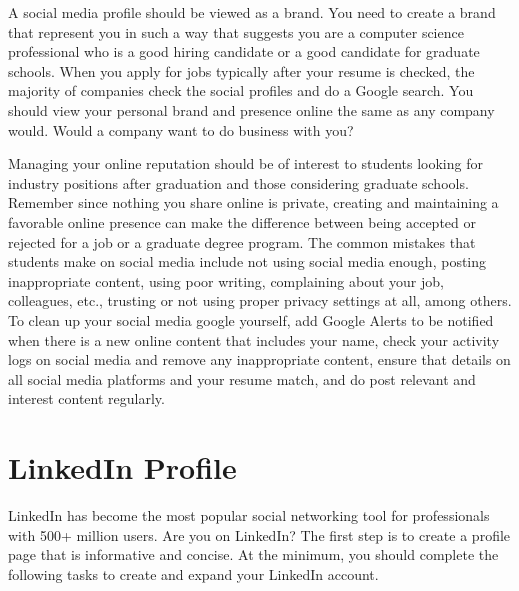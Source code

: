 \documentclass[11pt]{article}
\begin{document}
A social media profile should be viewed as a brand. You need to create a brand that represent you in such a way that suggests you are a computer science professional who is a good hiring candidate or a good candidate for graduate schools. When you apply for jobs typically after your resume is checked, the majority of companies check the social profiles and do a Google search. You should view your personal brand and presence online the same as any company would.  Would a company want to do business with you?

 Managing your online reputation should be of interest to students looking for industry positions after graduation and  those considering graduate schools. Remember since nothing you share online is private, creating and maintaining a favorable online presence can make the difference between being accepted or rejected for a job or a graduate degree program.
The common mistakes that students make on social media include not using social media enough, posting inappropriate content, using poor writing, complaining about your job, colleagues, etc., trusting or not using proper privacy settings at all, among others. To clean up your social media google yourself, add Google Alerts to be notified when there is a new online content that includes your name, check your activity logs on social media and remove any inappropriate content, ensure that details on all social media platforms and your resume match, and do post relevant and interest content regularly.

\section*{LinkedIn Profile}
\label{linkedin}
LinkedIn has become the most popular social networking tool for professionals with  500+ million users. Are you on LinkedIn? The first step is
to create a profile page that is informative and concise. At the minimum, you should complete the following tasks to create and expand your LinkedIn account. 
\end{document}
